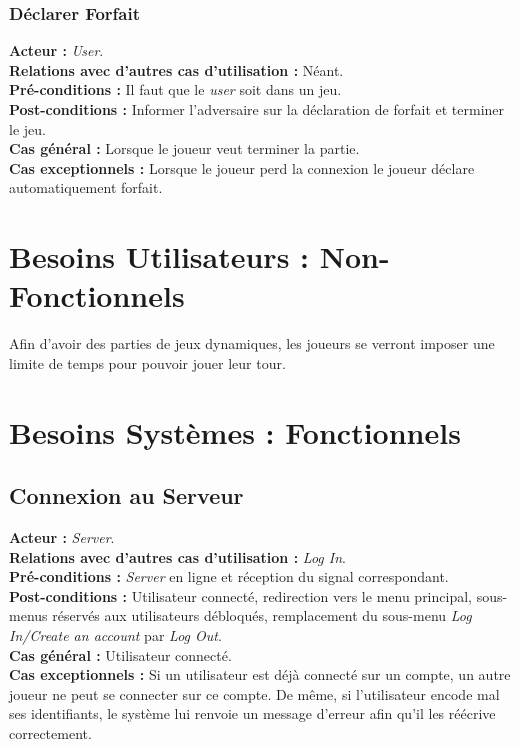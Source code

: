\documentclass[10pt, a4paper]{article}
\begin{document}
\subsubsection{Déclarer Forfait}
\textbf{Acteur :} \textit{User}.\\
\textbf{Relations avec d'autres cas d'utilisation :} Néant.\\
\textbf{Pré-conditions :} Il faut que le \textit{user} soit dans un jeu. \\
\textbf{Post-conditions :} Informer l'adversaire sur la déclaration de forfait et terminer le jeu.\\
\textbf{Cas général :} Lorsque le joueur veut terminer la partie.\\
\textbf{Cas exceptionnels :} Lorsque le joueur perd la connexion le joueur déclare automatiquement forfait. %

\section{Besoins Utilisateurs : Non-Fonctionnels}
Afin d'avoir des parties de jeux dynamiques, les joueurs se verront imposer une limite de temps pour pouvoir jouer leur tour. \\

\section{Besoins Systèmes : Fonctionnels}

\subsection{Connexion au Serveur}
\textbf{Acteur :} \textit{Server}. \\
\textbf{Relations avec d'autres cas d'utilisation :} \textit{Log In}. \\
\textbf{Pré-conditions :} \textit{Server} en ligne et réception du signal correspondant. \\
\textbf{Post-conditions :} Utilisateur connecté, redirection vers le menu principal, sous-menus réservés aux utilisateurs débloqués, remplacement du sous-menu \textit{Log In/Create an account} par \textit{Log Out}. \\
\textbf{Cas général :} Utilisateur connecté. \\
\textbf{Cas exceptionnels :} Si un utilisateur est déjà connecté sur un compte, un autre joueur ne peut se connecter sur ce compte. De même, si l’utilisateur encode mal ses identifiants, le système lui renvoie un message d’erreur afin qu’il les réécrive correctement. \\
\end{document}
